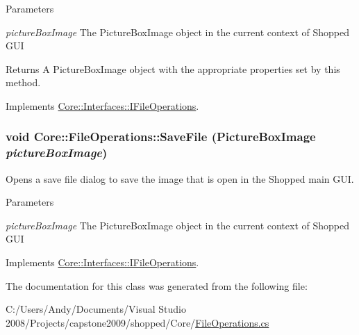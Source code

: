 \begin{DoxyParams}{Parameters}
\item[{\em pictureBoxImage}]The PictureBoxImage object in the current context of Shopped GUI \end{DoxyParams}
\begin{DoxyReturn}{Returns}
A PictureBoxImage object with the appropriate properties set by this method. 
\end{DoxyReturn}


Implements \hyperlink{interface_core_1_1_interfaces_1_1_i_file_operations_a373c3e1cc40a59b65e77cf9551463419}{Core::Interfaces::IFileOperations}.\hypertarget{class_core_1_1_file_operations_a0fc5427e96d79e70c6409ec22e70abba}{
\subsubsection[{SaveFile}]{\setlength{\rightskip}{0pt plus 5cm}void Core::FileOperations::SaveFile ({\bf PictureBoxImage} {\em pictureBoxImage})}}
\label{class_core_1_1_file_operations_a0fc5427e96d79e70c6409ec22e70abba}
Opens a save file dialog to save the image that is open in the Shopped main GUI.


\begin{DoxyParams}{Parameters}
\item[{\em pictureBoxImage}]The PictureBoxImage object in the current context of Shopped GUI \end{DoxyParams}


Implements \hyperlink{interface_core_1_1_interfaces_1_1_i_file_operations_a254301628fd3053115f557626aa71f14}{Core::Interfaces::IFileOperations}.

The documentation for this class was generated from the following file:\begin{DoxyCompactItemize}
\item 
C:/Users/Andy/Documents/Visual Studio 2008/Projects/capstone2009/shopped/Core/\hyperlink{_file_operations_8cs}{FileOperations.cs}\end{DoxyCompactItemize}
